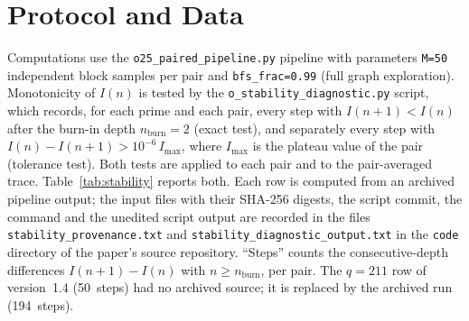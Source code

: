 \documentclass[11pt,a4paper]{article}
\begin{document}
  \section{Protocol and Data}

  Computations use the \texttt{o25\_paired\_pipeline.py} pipeline with
  parameters \texttt{M=50} independent block samples per pair and
  \texttt{bfs\_frac=0.99} (full graph exploration).
  Monotonicity of $I(n)$ is tested by the
  \texttt{o\_stability\_diagnostic.py} script, which records,
  for each prime and each pair, every step with $I(n{+}1) < I(n)$
  after the burn-in depth $n_{\mathrm{burn}} = 2$ (exact test), and separately every step
  with $I(n) - I(n{+}1) > 10^{-6}\, I_{\max}$, where $I_{\max}$ is the plateau value of
  the pair (tolerance test).
  Both tests are applied to each pair and to the pair-averaged trace.
  Table~\ref{tab:stability} reports both.
  Each row is computed from an archived pipeline output; the input files with their
  SHA-256 digests, the script commit, the command and the unedited script output are
  recorded in the files \texttt{stability\_provenance.txt} and
  \texttt{stability\_diagnostic\_output.txt} in the \texttt{code} directory of the
  paper's source repository.
  ``Steps'' counts the consecutive-depth differences $I(n{+}1) - I(n)$ with
  $n \geq n_{\mathrm{burn}}$, per pair.
  The $q = 211$ row of version~1.4 (50~steps) had no archived source; it is replaced by
  the archived run (194~steps).
\end{document}
